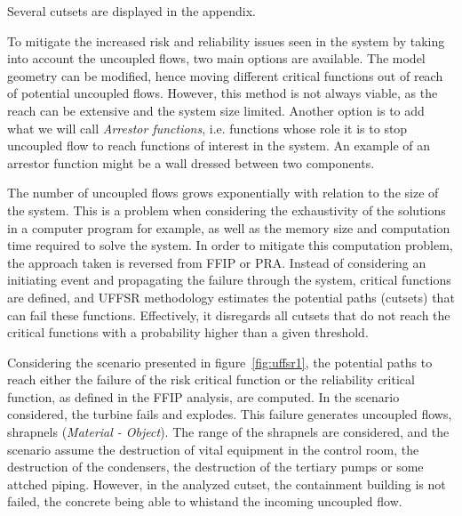Several cutsets are displayed in the appendix.

To mitigate the increased risk and reliability issues seen in the system by taking into account the uncoupled flows, two main options are available. The model geometry can be modified, hence moving different critical functions out of reach of potential uncoupled flows. However, this method is not always viable, as the reach can be extensive and the system size limited. Another option is to add what we will call \textit{Arrestor functions}, i.e. functions whose role it is to stop uncoupled flow to reach functions of interest in the system. An example of an arrestor function might be a wall dressed between two components.

The number of uncoupled flows grows exponentially with relation to the size of the system. This is a problem when considering the exhaustivity of the solutions in a computer program for example, as well as the memory size and computation time required to solve the system. In order to mitigate this computation problem, the approach taken is reversed from FFIP or PRA. Instead of considering an initiating event and propagating the failure through the system, critical functions are defined, and UFFSR methodology estimates the potential paths (cutsets) that can fail these functions. Effectively, it disregards all cutsets that do not reach the critical functions with a probability higher than a given threshold.

Considering the scenario presented in figure~\ref{fig:uffsr1}, the potential paths to reach either the failure of the risk critical function or the reliability critical function, as defined in the FFIP analysis, are computed. In the scenario considered, the turbine fails and explodes. This failure generates uncoupled flows, shrapnels (\textit{Material - Object}). The range of the shrapnels are considered, and the scenario assume the destruction of vital equipment in the control room, the destruction of the condensers, the destruction of the tertiary pumps or some attched piping. However, in the analyzed cutset, the containment building is not failed, the concrete being able to whistand the incoming uncoupled flow.

